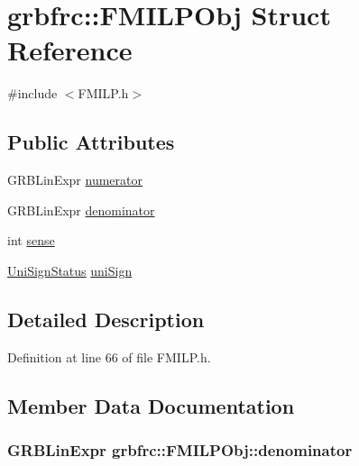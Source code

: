 \hypertarget{structgrbfrc_1_1FMILPObj}{}\section{grbfrc\+:\+:F\+M\+I\+L\+P\+Obj Struct Reference}
\label{structgrbfrc_1_1FMILPObj}


{\ttfamily \#include $<$F\+M\+I\+L\+P.\+h$>$}

\subsection*{Public Attributes}
\begin{DoxyCompactItemize}
\item 
G\+R\+B\+Lin\+Expr \hyperlink{structgrbfrc_1_1FMILPObj_a01c26f8e99a6692909e562aa561c9274}{numerator}
\item 
G\+R\+B\+Lin\+Expr \hyperlink{structgrbfrc_1_1FMILPObj_a73deb875d3546667487959e7b15878d6}{denominator}
\item 
int \hyperlink{structgrbfrc_1_1FMILPObj_a65e9d84a220fc53712fb1dd7a30cad59}{sense}
\item 
\hyperlink{namespacegrbfrc_a26ee84e31d7fae9e033413a2a5e1f0ca}{Uni\+Sign\+Status} \hyperlink{structgrbfrc_1_1FMILPObj_ab5f06f05e7cb926e59e3f70978f69d5c}{uni\+Sign}
\end{DoxyCompactItemize}


\subsection{Detailed Description}


Definition at line 66 of file F\+M\+I\+L\+P.\+h.



\subsection{Member Data Documentation}
\subsubsection[{\texorpdfstring{denominator}{denominator}}]{\setlength{\rightskip}{0pt plus 5cm}G\+R\+B\+Lin\+Expr grbfrc\+::\+F\+M\+I\+L\+P\+Obj\+::denominator}\hypertarget{structgrbfrc_1_1FMILPObj_a73deb875d3546667487959e7b15878d6}{}\label{structgrbfrc_1_1FMILPObj_a73deb875d3546667487959e7b15878d6}


